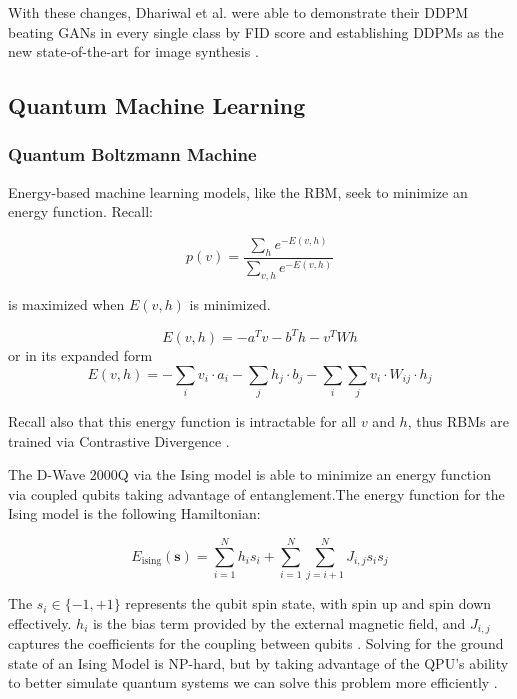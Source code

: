 \documentclass[%
 reprint,
 amsmath,amssymb,
 aps,
]{revtex4-2}
\begin{document}
With these changes, Dhariwal et al. were able to demonstrate their DDPM beating GANs in every single class by FID score and establishing DDPMs as the new state-of-the-art for image synthesis  \cite{dhariwal2021diffusion}.

\subsection{Quantum Machine Learning}
\subsubsection{Quantum Boltzmann Machine}
Energy-based machine learning models, like the RBM, seek to minimize an energy function. Recall:

\begin{equation}
p(v) = \frac{\sum_{h} e^{-E(v,h)}}{\sum_{v,h}e^{-E(v,h)}}
\end{equation}


is maximized when $E(v,h)$ is minimized.

\begin{equation}
E(v, h) = -a^Tv -b^Th -v^TWh
\end{equation}
or in its expanded form
\begin{equation}
E(v, h) = - \sum_{i} v_i \cdot a_i - \sum_{j} h_j \cdot b_j - \sum_{i} \sum_{j} v_i \cdot W_{ij} \cdot h_j
\end{equation}

Recall also that this energy function is intractable for all $v$ and $h$, thus RBMs are trained via Contrastive Divergence \cite{trainingrbms}.

The D-Wave 2000Q via the Ising model is able to minimize an energy function via coupled qubits taking advantage of entanglement.The energy function for the Ising model is the following Hamiltonian:

\begin{equation}
E_{\text{ising}}(\mathbf{s}) = \sum_{i=1}^N h_i s_i + \sum_{i=1}^N \sum_{j=i+1}^N J_{i,j} s_i s_j
\end{equation}



The $s_i \in \{-1, +1\}$ represents the qubit spin state, with spin up and spin down effectively. $h_i$ is the bias term provided by the external magnetic field, and $J_{i,j}$ captures the coefficients for the coupling between qubits \cite{dwavedocs}. Solving for the ground state of an Ising Model is NP-hard, but by taking advantage of the QPU's ability to better simulate quantum systems we can solve this problem more efficiently \cite{monte}.
\end{document}
